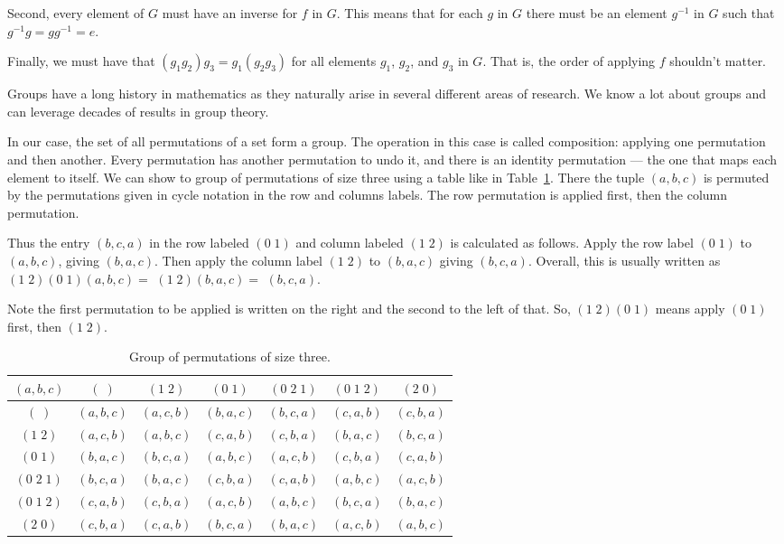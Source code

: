 \documentclass{iansnotes}
\begin{document}
  Second, every element of $G$ must have an inverse for $f$ in $G$.
  This means that for each $g$ in $G$ there must be an element $g^{-1}$ in $G$ such that $g^{-1}g = gg^{-1} = e$.

  Finally, we must have that $(g_1 g_2)g_3 = g_1 (g_2 g_3)$ for all elements $g_1$, $g_2$, and $g_3$ in $G$.
  That is, the order of applying $f$ shouldn't matter.

  Groups have a long history in mathematics as they naturally arise in several different areas of research.
  We know a lot about groups and can leverage decades of results in group theory.

  In our case, the set of all permutations of a set form a group.
  The operation in this case is called composition: applying one permutation and then another.
  Every permutation has another permutation to undo it, and there is an identity permutation --- the one that maps each element to itself.
  We can show to group of permutations of size three using a table like in Table~\ref{table:group}.
  There the tuple $(a,b,c)$ is permuted by the permutations given in cycle notation in the row and columns labels.
  The row permutation is applied first, then the column permutation.

  Thus the entry $(b,c,a)$ in the row labeled $(0\;1)$ and column labeled $(1\;2)$ is calculated as follows.
  Apply the row label $(0\;1)$ to $(a,b,c)$, giving $(b,a,c)$.
  Then apply the column label $(1\;2)$ to $(b,a,c)$ giving $(b,c,a)$.
  Overall, this is usually written as $(1\;2)(0\;1)(a,b,c) = $ $(1\; 2)(b,a,c)=$ $(b,c,a)$.
  
  Note the first permutation to be applied is written on the right and the second to the left of that.
  So, $(1\;2)(0\;1)$ means apply $(0\;1)$ first, then $(1\;2)$.
  
  \begin{table}
    \centering
    \begin{tabular}{c|cccccc}
      $(a,b,c)$   & $(\;)$    & $(1\;2)$  & $(0\;1)$  & $(0\;2\;1)$ & $(0\;1\;2)$ & $(2\;0)$ \\
      \midrule
      $(\;)$      & $(a,b,c)$ & $(a,c,b)$ & $(b,a,c)$ & $(b,c,a)$   & $(c,a,b)$   & $(c,b,a)$ \\
      $(1\;2)$    & $(a,c,b)$ & $(a,b,c)$ & $(c,a,b)$ & $(c,b,a)$   & $(b,a,c)$   & $(b,c,a)$ \\
      $(0\;1)$    & $(b,a,c)$ & $(b,c,a)$ & $(a,b,c)$ & $(a,c,b)$   & $(c,b,a)$   & $(c,a,b)$ \\
      $(0\;2\;1)$ & $(b,c,a)$ & $(b,a,c)$ & $(c,b,a)$ & $(c,a,b)$   & $(a,b,c)$   & $(a,c,b)$ \\
      $(0\;1\;2)$ & $(c,a,b)$ & $(c,b,a)$ & $(a,c,b)$ & $(a,b,c)$   & $(b,c,a)$   & $(b,a,c)$ \\
      $(2\;0)$    & $(c,b,a)$ & $(c,a,b)$ & $(b,c,a)$ & $(b,a,c)$   & $(a,c,b)$   & $(a,b,c)$ \\
    \end{tabular}
    \caption{Group of permutations of size three.}
    \label{table:group}
  \end{table}
  \vspace{4mm}
\end{document}
